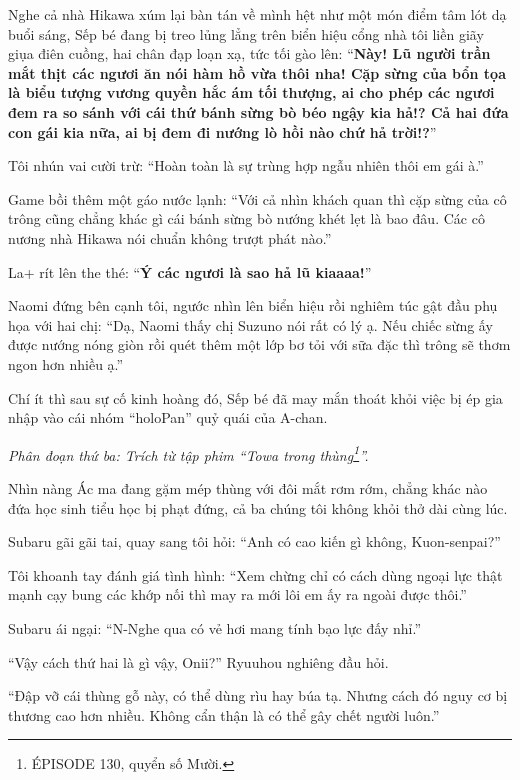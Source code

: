 \documentclass[../main.tex]{subfiles}
\begin{document}
Nghe cả nhà Hikawa xúm lại bàn tán về mình hệt như một món điểm tâm lót dạ buổi sáng, Sếp bé đang bị treo lủng lẳng trên biển hiệu cổng nhà tôi liền giãy giụa điên cuồng, hai chân đạp loạn xạ, tức tối gào lên: ``\textbf{Này! Lũ người trần mắt thịt các ngươi ăn nói hàm hồ vừa thôi nha! Cặp sừng của bổn tọa là biểu tượng vương quyền hắc ám tối thượng, ai cho phép các ngươi đem ra so sánh với cái thứ bánh sừng bò béo ngậy kia hả!? Cả hai đứa con gái kia nữa, ai bị đem đi nướng lò hồi nào chứ hả trời!?}''

Tôi nhún vai cười trừ: ``Hoàn toàn là sự trùng hợp ngẫu nhiên thôi em gái à.''

Game bồi thêm một gáo nước lạnh: ``Với cả nhìn khách quan thì cặp sừng của cô trông cũng chẳng khác gì cái bánh sừng bò nướng khét lẹt là bao đâu. Các cô nương nhà Hikawa nói chuẩn không trượt phát nào.''

La+ rít lên the thé: ``\textbf{Ý các ngươi là sao hả lũ kiaaaa!}''

Naomi đứng bên cạnh tôi, ngước nhìn lên biển hiệu rồi nghiêm túc gật đầu phụ họa với hai chị: ``Dạ, Naomi thấy chị Suzuno nói rất có lý ạ. Nếu chiếc sừng ấy được nướng nóng giòn rồi quét thêm một lớp bơ tỏi với sữa đặc thì trông sẽ thơm ngon hơn nhiều ạ.''

Chí ít thì sau sự cố kinh hoàng đó, Sếp bé đã may mắn thoát khỏi việc bị ép gia nhập vào cái nhóm ``holoPan'' quỷ quái của A-chan.

\il

\textit{Phân đoạn thứ ba: Trích từ tập phim ``Towa trong thùng\footnote{{\flaregothic ÉPISODE 130}, quyển số Mười.}''.}

Nhìn nàng Ác ma đang gặm mép thùng với đôi mắt rơm rớm, chẳng khác nào đứa học sinh tiểu học bị phạt đứng, cả ba chúng tôi không khỏi thở dài cùng lúc.

Subaru gãi gãi tai, quay sang tôi hỏi: ``Anh có cao kiến gì không, Kuon-senpai?''

Tôi khoanh tay đánh giá tình hình: ``Xem chừng chỉ có cách dùng ngoại lực thật mạnh cạy bung các khớp nối thì may ra mới lôi em ấy ra ngoài được thôi.''

Subaru ái ngại: ``N-Nghe qua có vẻ hơi mang tính bạo lực đấy nhỉ.''

``Vậy cách thứ hai là gì vậy, Onii?'' Ryuuhou nghiêng đầu hỏi.

``Đập vỡ cái thùng gỗ này, có thể dùng rìu hay búa tạ. Nhưng cách đó nguy cơ bị thương cao hơn nhiều. Không cẩn thận là có thể gây chết người luôn.''
\end{document}
